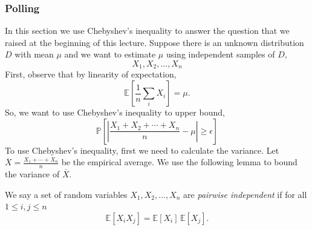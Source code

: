 
\subsubsection{Polling}

In this section we use Chebyshev's inequality to answer the question that we raised at the beginning of this lecture. Suppose there is an unknown distribution $D$ with mean $\mu$ and we want to estimate $\mu$ using independent samples of $D$,
\[
  X_1, X_2, \ldots, X_n
\]
First, observe that by linearity of expectation,
\[
  \mathbb{E}\left[\frac{1}{n}\sum_i X_i\right] = \mu.
\]
So, we want to use Chebyshev's inequality to upper bound,
\[
  \mathbb{P}\left[\left|\frac{X_1+X_2+\cdots+X_n}{n} - \mu\right| \ge \epsilon\right]
\]
To use Chebyshev's inequality, first we need to calculate the variance. Let $\overline{X}=\frac{X_1+\cdots+X_n}{n}$ be the empirical average. We use the following lemma to bound the variance of $\overline{X}$.

We say a set of random variables $X_1,X_2,\ldots,X_n$ are \emph{pairwise independent} if for all $1\le i,j\le n$
\[
  \mathbb{E}[X_iX_j] = \mathbb{E}[X_i]\,\mathbb{E}[X_j].
\]



